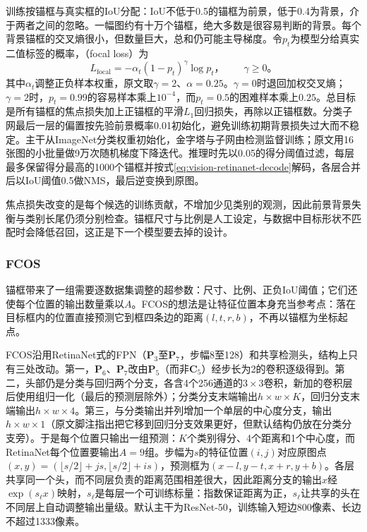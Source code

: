 训练按锚框与真实框的IoU分配：IoU不低于0.5的锚框为前景，低于0.4为背景，介于两者之间的忽略。一幅图约有十万个锚框，绝大多数是很容易判断的背景。每个背景锚框的交叉熵很小，但数量巨大，总和仍可能主导梯度。令$p_t$为模型分给真实二值标签的概率，（focal loss）为
\begin{equation}
 L_{\mathrm{focal}}=-\alpha_t(1-p_t)^\gamma\log p_t\text{，}
 \qquad\gamma\geq0\text{。}
 \label{eq:vision-focal-loss}
\end{equation}
其中$\alpha_t$调整正负样本权重，原文取$\gamma=2$、$\alpha=0.25$。$\gamma=0$时退回加权交叉熵；$\gamma=2$时，$p_t=0.99$的容易样本乘上$10^{-4}$，而$p_t=0.5$的困难样本乘上$0.25$。总目标是所有锚框的焦点损失加上正锚框的平滑$L_1$回归损失，再除以正锚框数。分类子网最后一层的偏置按先验前景概率0.01初始化，避免训练初期背景损失过大而不稳定。主干从ImageNet分类权重初始化，金字塔与子网由检测监督训练；原文用16张图的小批量做9万次随机梯度下降迭代。推理时先以0.05的得分阈值过滤，每层最多保留得分最高的1000个锚框并按式\eqref{eq:vision-retinanet-decode}解码，各层合并后以IoU阈值0.5做NMS，最后逆变换到原图。

焦点损失改变的是每个候选的训练贡献，不增加少见类别的观测，因此前景背景失衡与类别长尾仍须分别检查。锚框尺寸与比例是人工设定，与数据中目标形状不匹配时会降低召回，这正是下一个模型要去掉的设计。

\subsubsection{FCOS}
\label{sec:vision-recognition-fcos}

锚框带来了一组需要逐数据集调整的超参数：尺寸、比例、正负IoU阈值；它们还使每个位置的输出数量乘以$A$。FCOS的想法是让特征位置本身充当参考点：落在目标框内的位置直接预测它到框四条边的距离$(l,t,r,b)$，不再以锚框为坐标起点。

FCOS沿用RetinaNet式的FPN（$\bm{P}_3$至$\bm{P}_7$，步幅8至128）和共享检测头，结构上只有三处改动。第一，$\bm{P}_6$、$\bm{P}_7$改由$\bm{P}_5$（而非$\bm{C}_5$）经步长为2的卷积逐级得到。第二，头部仍是分类与回归两个分支，各含4个256通道的$3\times3$卷积，新加的卷积层后使用组归一化（最后的预测层除外）；分类分支末端输出$h\times w\times K$，回归分支末端输出$h\times w\times4$。第三，与分类输出并列增加一个单层的中心度分支，输出$h\times w\times1$（原文脚注指出把它移到回归分支效果更好，但默认结构仍放在分类分支旁）。于是每个位置只输出一组预测：$K$个类别得分、4个距离和1个中心度，而RetinaNet每个位置要输出$A=9$组。步幅为$s$的特征位置$(i,j)$对应原图点$(x,y)=(\lfloor s/2\rfloor+js,\lfloor s/2\rfloor+is)$，预测框为$(x-l,y-t,x+r,y+b)$。各层共享同一个头，而不同层负责的距离范围相差很大，因此距离分支的输出$x$经$\exp(s_\ell x)$映射，$s_\ell$是每层一个可训练标量：指数保证距离为正，$s_\ell$让共享的头在不同层上自动调整输出量级。默认主干为ResNet-50，训练输入短边800像素、长边不超过1333像素。

